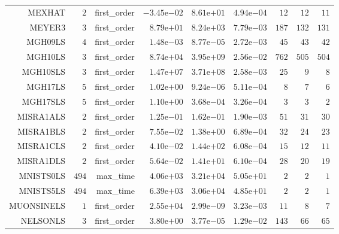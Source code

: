 \begin{longtable}{rrrrrrrrr}
MEXHAT & \(     2\) & first\_order & \(-3.45\)e\(-02\) & \( 8.61\)e\(+01\) & \( 4.94\)e\(-04\) & \(    12\) & \(    12\) & \(    11\) \\
MEYER3 & \(     3\) & first\_order & \( 8.79\)e\(+01\) & \( 8.24\)e\(+03\) & \( 7.79\)e\(-03\) & \(   187\) & \(   132\) & \(   131\) \\
MGH09LS & \(     4\) & first\_order & \( 1.48\)e\(-03\) & \( 8.77\)e\(-05\) & \( 2.72\)e\(-03\) & \(    45\) & \(    43\) & \(    42\) \\
MGH10LS & \(     3\) & first\_order & \( 8.74\)e\(+04\) & \( 3.95\)e\(+09\) & \( 2.56\)e\(-02\) & \(   762\) & \(   505\) & \(   504\) \\
MGH10SLS & \(     3\) & first\_order & \( 1.47\)e\(+07\) & \( 3.71\)e\(+08\) & \( 2.58\)e\(-03\) & \(    25\) & \(     9\) & \(     8\) \\
MGH17LS & \(     5\) & first\_order & \( 1.02\)e\(+00\) & \( 9.24\)e\(-06\) & \( 5.11\)e\(-04\) & \(     8\) & \(     7\) & \(     6\) \\
MGH17SLS & \(     5\) & first\_order & \( 1.10\)e\(+00\) & \( 3.68\)e\(-04\) & \( 3.26\)e\(-04\) & \(     3\) & \(     3\) & \(     2\) \\
MISRA1ALS & \(     2\) & first\_order & \( 1.25\)e\(-01\) & \( 1.62\)e\(-01\) & \( 1.90\)e\(-03\) & \(    51\) & \(    31\) & \(    30\) \\
MISRA1BLS & \(     2\) & first\_order & \( 7.55\)e\(-02\) & \( 1.38\)e\(+00\) & \( 6.89\)e\(-04\) & \(    32\) & \(    24\) & \(    23\) \\
MISRA1CLS & \(     2\) & first\_order & \( 4.10\)e\(-02\) & \( 1.44\)e\(+02\) & \( 6.08\)e\(-04\) & \(    15\) & \(    12\) & \(    11\) \\
MISRA1DLS & \(     2\) & first\_order & \( 5.64\)e\(-02\) & \( 1.41\)e\(+01\) & \( 6.10\)e\(-04\) & \(    28\) & \(    20\) & \(    19\) \\
MNISTS0LS & \(   494\) & max\_time & \( 4.06\)e\(+03\) & \( 3.21\)e\(+04\) & \( 5.05\)e\(+01\) & \(     2\) & \(     2\) & \(     1\) \\
MNISTS5LS & \(   494\) & max\_time & \( 6.39\)e\(+03\) & \( 3.06\)e\(+04\) & \( 4.85\)e\(+01\) & \(     2\) & \(     2\) & \(     1\) \\
MUONSINELS & \(     1\) & first\_order & \( 2.55\)e\(+04\) & \( 2.99\)e\(-09\) & \( 3.23\)e\(-03\) & \(    11\) & \(     8\) & \(     7\) \\
NELSONLS & \(     3\) & first\_order & \( 3.80\)e\(+00\) & \( 3.77\)e\(-05\) & \( 1.29\)e\(-02\) & \(   143\) & \(    66\) & \(    65\) \\

\end{longtable}
